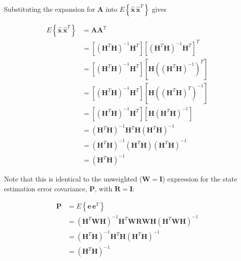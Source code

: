 Substituting the expansion for $\mathbf{A}$ into
$E \left\{ \hat{\mathbf{x}} \, \hat{\mathbf{x}}^T \right\}$ gives

\begin{equation*}
    \begin{aligned}
        E \left\{ \hat{\mathbf{x}} \, \hat{\mathbf{x}}^T \right\} &= \mathbf{A} \mathbf{A}^T \\
        &= \left[ \left( \mathbf{H}^T \mathbf{H} \right)^{-1} \mathbf{H}^T \right] \left[ \left( \mathbf{H}^T \mathbf{H} \right)^{-1} \mathbf{H}^T \right]^T \\
        &= \left[ \left( \mathbf{H}^T \mathbf{H} \right)^{-1} \mathbf{H}^T \right] \left[ \mathbf{H} \left( \left( \mathbf{H}^T \mathbf{H} \right)^{-1} \right)^T \right] \\
        &= \left[ \left( \mathbf{H}^T \mathbf{H} \right)^{-1} \mathbf{H}^T \right] \left[ \mathbf{H} \left( \left( \mathbf{H}^T \mathbf{H} \right)^T \right)^{-1} \right] \\
        &= \left[ \left( \mathbf{H}^T \mathbf{H} \right)^{-1} \mathbf{H}^T \right] \left[ \mathbf{H} \left( \mathbf{H}^T \mathbf{H} \right)^{-1} \right] \\
        &= \left( \mathbf{H}^T \mathbf{H} \right)^{-1} \mathbf{H}^T \mathbf{H} \left( \mathbf{H}^T \mathbf{H} \right)^{-1} \\
        &= \left( \mathbf{H}^T \mathbf{H} \right)^{-1} \left( \mathbf{H}^T \mathbf{H} \right) \left( \mathbf{H}^T \mathbf{H} \right)^{-1} \\
        &= \left( \mathbf{H}^T \mathbf{H} \right)^{-1}
    \end{aligned}
\end{equation*}

Note that this is identical to the unweighted ($\mathbf{W} = \mathbf{I}$) expression for
the state estimation error covariance, $\mathbf{P}$, with $\mathbf{R} = \mathbf{I}$:

\begin{equation*}
    \begin{aligned}
        \mathbf{P} &= E \left\{ \mathbf{e} \, \mathbf{e}^T \right\} \\
        &= \left( \mathbf{H}^T \mathbf{W} \mathbf{H} \right)^{-1} \mathbf{H}^T \mathbf{W}
           \mathbf{R}
           \mathbf{W} \mathbf{H} \left( \mathbf{H}^T \mathbf{W} \mathbf{H} \right)^{-1} \\
        &= \left( \mathbf{H}^T \mathbf{H} \right)^{-1} \mathbf{H}^T \mathbf{H} \left( \mathbf{H}^T \mathbf{H} \right)^{-1} \\
        &= \left( \mathbf{H}^T \mathbf{H} \right)^{-1}
    \end{aligned}
\end{equation*}

